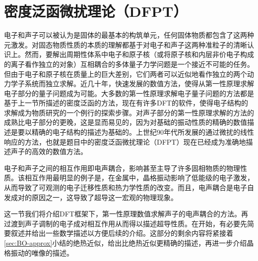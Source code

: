 \section{密度泛函微扰理论（DFPT）}

电子和声子可以被认为是固体的最基本的构筑单元，任何固体物质都包含了这两种元激发。对固态物质性质的本质的理解都基于对电子和声子这两种准粒子的清晰认识上。然而，要解出周期性体系中电子和原子核（或将原子核和内层非价电子构成的离子看作独立的对象）互相耦合的多体量子力学问题是一个接近不可能的任务。但由于电子和原子核在质量上的巨大差别，它们两者可以近似地看作独立的两个动力学子系统而独立求解。近几十年，快速发展的数值方法，使得从第一性原理求解电子部分的量子问题成为可能。大多数的第一性原理求解电子量子问题的方法都是基于上一节所描述的密度泛函的方法，现在有许多DFT的软件，使得电子结构的求解成为物质研究的一个例行的探索步骤。对声子部分的第一性原理求解的方法的成熟比电子部分的更晚，这是显而易见的，因为对基础的振动性质的精确的数值描述是要以精确的电子结构的描述为基础的。上世纪90年代所发展的通过微扰的线性响应的方法，也就是题目中的密度泛函微扰理论（DFPT）现在已经成为准确地描述声子的高效的数值方法。

电子和声子之间的相互作用即电声耦合，影响甚至主导了许多固相物质的物理性质。该相互作用最明显的例子是，在金属中，晶格振动影响了低能级的电子激发，从而导致了可观测的电子迁移性质和热力学性质的改变。而且，电声耦合是电子自发成对的原因之一，这导致了超导这一宏观的物理现象。

这一节我们将介绍DFT框架下，第一性原理数值求解声子的电声耦合的方法。再过渡到声子调制的电子成对相互作用从而得以描述超导性质。在开始，有必要先简要叙述并给出一些数学描述以方便后续的介绍。这部分的剩余内容将紧接着\ref{sec:BO-approx}小结的绝热近似，给出比绝热近似更精确的描述，再进一步介绍晶格振动的唯像的描述。

